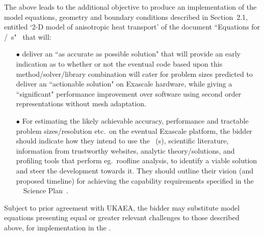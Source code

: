 The above leads to the additional objective to produce an implementation of the model equations,
geometry and boundary conditions described in  Section~2.1,
entitled `2-D model of anisotropic heat transport' of the 
document ``Equations for \exc/\nep \ \Papp s"~\cite{pappeqs} that will:
\begin{itemize}
\item[$\bullet$] deliver an ``as accurate as possible solution" that will provide an early indication 
as to whether or not the eventual code based upon this method/solver/library combination will 
cater for problem sizes predicted to deliver an ``actionable solution" on Exascale hardware, 
while giving a ``significant" performance improvement over software using second order representations
without mesh adaptation.
 
\item[$\bullet$] For estimating the likely achievable accuracy, performance and tractable problem sizes/resolution
etc.\ on the eventual Exascale platform, the bidder should indicate how they intend to use the \nep \ \papp(s),
scientific literature, information from trustworthy websites,  analytic theory/solutions, and profiling tools that
perform eg.\  roofline analysis, to identify a viable solution and steer the development towards it.
They should outline their vision (and proposed timeline) for achieving the capability requirements
specified in the \exc\ \nep\  Science Plan~\cite{sciplan}.
\end{itemize}
Subject to prior agreement with UKAEA, the bidder may substitute model equations presenting equal or
greater relevant challenges to those described above, for implementation in the \Papp.
